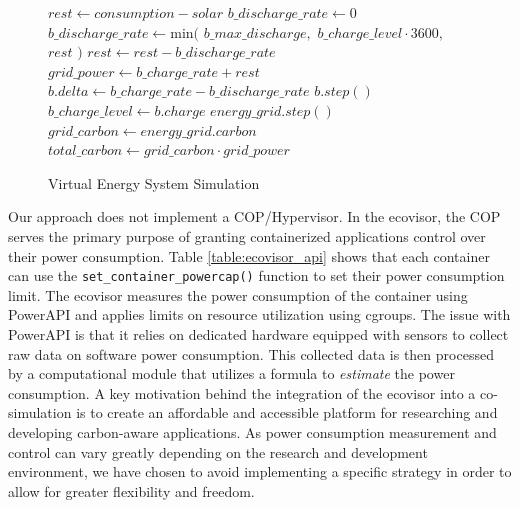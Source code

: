 \begin{figure}
    \removelatexerror
    \begin{algorithm}[H]
        \caption{Virtual Energy System Simulation}
        \label{alg:virtual_energy_system_simulation}
        $rest \gets consumption - solar$\;
         {
            $b\_discharge\_rate \gets 0$\;
        }{
            $b\_discharge\_rate \gets \text{min}($\;
            \Indp
                $b\_max\_discharge,$\;
                $b\_charge\_level \cdot 3600,$\;
                $rest$\;
            \Indm
            $)$\;
            $rest \gets rest - b\_discharge\_rate$\;
        }
        $grid\_power \gets b\_charge\_rate + rest$\;
        $b.delta \gets b\_charge\_rate - b\_discharge\_rate$\;
        $b.step()$\;
        $b\_charge\_level \gets b.charge$\;
        $energy\_grid.step()$\;
        $grid\_carbon \gets energy\_grid.carbon$\;
        $total\_carbon \gets grid\_carbon \cdot grid\_power$\;
        \vspace{3mm}
    \end{algorithm}
\end{figure}

Our approach does not implement a COP/Hypervisor. In the ecovisor, the COP
serves the primary purpose of granting containerized applications control over
their power consumption. Table \ref{table:ecovisor_api} shows that each
container can use the \texttt{set\_container\_powercap()} function to set their
power consumption limit. The ecovisor measures the power consumption of the
container using PowerAPI \cite{bourdon2013} and applies limits on resource
utilization using cgroups. The issue with PowerAPI is that it relies on
dedicated hardware equipped with sensors to collect raw data on software power
consumption. This collected data is then processed by a computational module
that utilizes a formula to \emph{estimate} the power consumption. A key
motivation behind the integration of the ecovisor into a co-simulation is to
create an affordable and accessible platform for researching and developing
carbon-aware applications. As power consumption measurement and control can vary
greatly depending on the research and development environment, we have chosen to
avoid implementing a specific strategy in order to allow for greater flexibility
and freedom.

